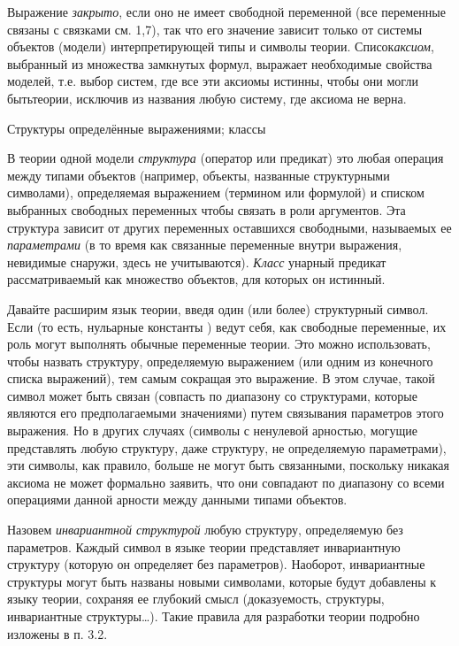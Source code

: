 Выражение {\it закрыто}, если оно не имеет свободной переменной (все переменные связаны с связками см. 1,7), так что его значение зависит только от системы объектов (модели) интерпретирующей типы и символы теории. Список{\it аксиом},  выбранный из множества замкнутых формул, выражает необходимые свойства моделей, т.е. выбор систем, где все эти аксиомы истинны, чтобы они могли бытьтеории, исключив из названия  любую систему, где аксиома не верна.

{\sst Структуры определённые выражениями; классы}

В теории одной модели {\it структура\/} (оператор или предикат) это любая операция между типами объектов (например, объекты, названные структурными символами), определяемая выражением (термином или формулой) и списком выбранных свободных переменных чтобы связать в роли аргументов. Эта структура зависит от других переменных оставшихся свободными, называемых ее {\it параметрами} (в то время как связанные переменные внутри выражения, невидимые снаружи, здесь не учитываются). {\it Класс\/} унарный предикат рассматриваемый как множество объектов, для которых он истинный.

 Давайте расширим язык теории, введя один (или более) структурный символ. Если    (то есть, нульарные константы ) ведут себя, как свободные переменные, их роль могут выполнять обычные переменные теории. Это можно использовать, чтобы назвать структуру, определяемую выражением (или одним из конечного списка выражений), тем самым сокращая это выражение. В этом случае, такой символ может быть связан (совпасть по диапазону со структурами, которые являются его предполагаемыми значениями) путем связывания параметров этого выражения. Но в других случаях (символы с ненулевой арностью, могущие представлять любую структуру, даже структуру, не определяемую параметрами), эти символы, как правило, больше не могут быть связанными, поскольку никакая аксиома не может формально заявить, что они совпадают по диапазону со всеми операциями данной арности между данными типами объектов. 

Назовем {\it инвариантной структурой} любую структуру, определяемую без параметров. Каждый символ в языке теории представляет инвариантную структуру (которую он определяет без параметров). Наоборот, инвариантные структуры могут быть названы новыми символами, которые будут добавлены к языку теории, сохраняя ее глубокий смысл (доказуемость, структуры, инвариантные структуры\dots). Такие правила для разработки теории подробно изложены в п. 3.2.


